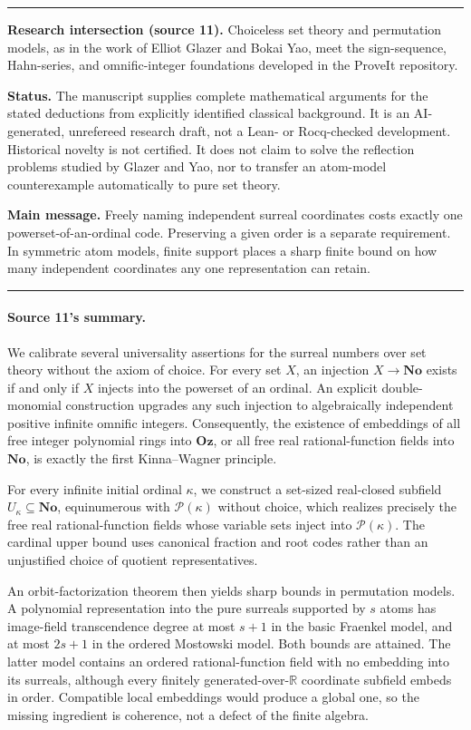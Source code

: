 \documentclass[11pt,letterpaper]{article}
\theoremstyle{definition}
\theoremstyle{remark}
\newcommand{\No}{\mathbf{No}}
\newcommand{\Pow}{\mathcal P}
\newcommand{\Oz}{\mathbf{Oz}}
\newcommand{\R}{\mathbb R}
\newenvironment{resultbox}{\par\medskip\noindent\begin{minipage}{\linewidth}\setlength{\parindent}{0pt}\hrule\medskip}{\medskip\hrule\end{minipage}\par\medskip}
\begin{document}
\begin{resultbox}
\textbf{Research intersection (source 11).} Choiceless set theory and permutation models, as in the work of Elliot Glazer and Bokai Yao, meet the sign-sequence, Hahn-series, and omnific-integer foundations developed in the ProveIt repository.

\medskip
\textbf{Status.} The manuscript supplies complete mathematical arguments for the stated deductions from explicitly identified classical background. It is an AI-generated, unrefereed research draft, not a Lean- or Rocq-checked development. Historical novelty is not certified. It does not claim to solve the reflection problems studied by Glazer and Yao, nor to transfer an atom-model counterexample automatically to pure set theory.

\medskip
\textbf{Main message.} Freely naming independent surreal coordinates costs exactly one powerset-of-an-ordinal code. Preserving a given order is a separate requirement. In symmetric atom models, finite support places a sharp finite bound on how many independent coordinates any one representation can retain.
\end{resultbox}

\paragraph{Source 11's summary.} We calibrate several universality assertions for the surreal numbers over set theory without the axiom of choice. For every set $X$, an injection $X\to\No$ exists if and only if $X$ injects into the powerset of an ordinal. An explicit double-monomial construction upgrades any such injection to algebraically independent positive infinite omnific integers. Consequently, the existence of embeddings of all free integer polynomial rings into $\Oz$, or all free real rational-function fields into $\No$, is exactly the first Kinna--Wagner principle.

For every infinite initial ordinal $\kappa$, we construct a set-sized real-closed subfield $U_\kappa\subseteq\No$, equinumerous with $\Pow(\kappa)$ without choice, which realizes precisely the free real rational-function fields whose variable sets inject into $\Pow(\kappa)$. The cardinal upper bound uses canonical fraction and root codes rather than an unjustified choice of quotient representatives.

An orbit-factorization theorem then yields sharp bounds in permutation models. A polynomial representation into the pure surreals supported by $s$ atoms has image-field transcendence degree at most $s+1$ in the basic Fraenkel model, and at most $2s+1$ in the ordered Mostowski model. Both bounds are attained. The latter model contains an ordered rational-function field with no embedding into its surreals, although every finitely generated-over-$\R$ coordinate subfield embeds in order. Compatible local embeddings would produce a global one, so the missing ingredient is coherence, not a defect of the finite algebra.
\end{document}
